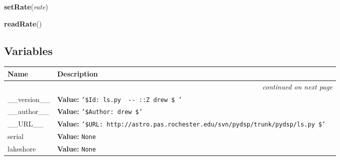     \label{ls321:setRate}

    \vspace{0.5ex}

    \begin{boxedminipage}{\textwidth}

    \raggedright \textbf{setRate}(\textit{rate})

    \end{boxedminipage}

    \label{ls321:readRate}

    \vspace{0.5ex}

    \begin{boxedminipage}{\textwidth}

    \raggedright \textbf{readRate}()

    \end{boxedminipage}



  \subsection{Variables}

\begin{longtable}{|p{}|p{}|l}
\cline{1-2}
\cline{1-2} \centering \textbf{Name} & \centering \textbf{Description}& \\
\cline{1-2}
\endhead\cline{1-2}\multicolumn{3}{r}{\small\textit{continued on next page}}\\\endfoot\cline{1-2}
\endlastfoot\raggedright \_\-\_\-v\-e\-r\-s\-i\-o\-n\-\_\-\_\- & \textbf{Value:} 
{\tt '\-\$\-I\-d\-:\-~\-l\-s\-3\-2\-1\-.\-p\-y\-~\-3\-9\-9\-~\-2\-0\-0\-6\--\-0\-6\--\-0\-4\-~\-2\-0\-:\-0\-2\-:\-1\-7\-Z\-~\-d\-r\-e\-w\-~\-\$\-~\-'\-}&\\
\cline{1-2}
\raggedright \_\-\_\-a\-u\-t\-h\-o\-r\-\_\-\_\- & \textbf{Value:} 
{\tt '\-\$\-A\-u\-t\-h\-o\-r\-:\-~\-d\-r\-e\-w\-~\-\$\-'\-}&\\
\cline{1-2}
\raggedright \_\-\_\-U\-R\-L\-\_\-\_\- & \textbf{Value:} 
{\tt '\-\$\-U\-R\-L\-:\-~\-h\-t\-t\-p\-:\-/\-/\-a\-s\-t\-r\-o\-.\-p\-a\-s\-.\-r\-o\-c\-h\-e\-s\-t\-e\-r\-.\-e\-d\-u\-/\-s\-v\-n\-/\-p\-y\-d\-s\-p\-/\-t\-r\-u\-n\-k\-/\-p\-y\-d\-s\-p\-/\-l\-s\-3\-2\-1\-.\-p\-y\-~\-\$\-'\-}&\\
\cline{1-2}
\raggedright s\-e\-r\-i\-a\-l\- & \textbf{Value:} 
{\tt N\-o\-n\-e\-}&\\
\cline{1-2}
\raggedright l\-a\-k\-e\-s\-h\-o\-r\-e\-3\-2\-1\- & \textbf{Value:} 
{\tt N\-o\-n\-e\-}&\\
\cline{1-2}
\end{longtable}

